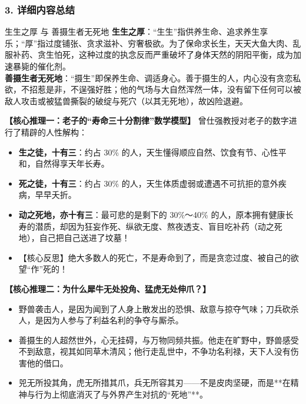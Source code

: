 \subsubsection{3. 详细内容总结}

\begin{ConceptBox}{生生之厚 与 善摄生者无死地}
\textbf{生生之厚}：“生生”指供养生命、追求养生享乐；“厚”指过度铺张、贪求滋补、穷奢极欲。为了保命求长生，天天大鱼大肉、乱服补药、贪生怕死，这种过度的执念反而严重破坏了身体天然的阴阳平衡，成为加速暴毙的催化剂。\\
\textbf{善摄生者无死地}：“摄生”即保养生命、调适身心。善于摄生的人，内心没有贪恋私欲，不招惹是非，不逞强好胜；他的气场与大自然浑然一体，没有留下任何可以被敌人攻击或被猛兽撕裂的破绽与死穴（以其无死地），故凶险退避。
\end{ConceptBox}

\noindent\textbf{【核心推理一：老子的“寿命三十分割律”数学模型】}
曾仕强教授对老子的数字进行了精辟的人性解构：
\begin{itemize}
    \item \textbf{生之徒，十有三}：约占 30\% 的人，天生懂得顺应自然、饮食有节、心性平和，自然得享天年长寿。
    \item \textbf{死之徒，十有三}：约占 30\% 的人，天生体质虚弱或遭遇不可抗拒的意外疾病，早早夭折。
    \item \textbf{动之死地，亦十有三}：最可悲的是剩下的 30\%～40\% 的人，原本拥有健康长寿的潜质，却因为狂妄作死、纵欲无度、熬夜透支、盲目吃补药（动之死地），自己把自己送进了坟墓！
    \item 【核心反思】绝大多数人的死亡，不是寿命到了，而是贪恋过度、被自己的欲望“作”死的！
\end{itemize}

\noindent\textbf{【核心推理二：为什么犀牛无处投角、猛虎无处伸爪？】}
\begin{itemize}
    \item 野兽袭击人，是因为闻到了人身上散发出的恐惧、敌意与掠夺气味；刀兵砍杀人，是因为人参与了利益名利的争夺与厮杀。
    \item 善摄生的人超然世外，心无挂碍，与万物同频共振。他走在旷野中，野兽感受不到敌意，视其如同草木清风；他行走乱世中，不争功名利禄，天下人没有伤害他的借口。
    \item 兕无所投其角，虎无所措其爪，兵无所容其刃——不是皮肉坚硬，而是**在精神与行为上彻底消灭了与外界产生对抗的“死地”**。
\end{itemize}

